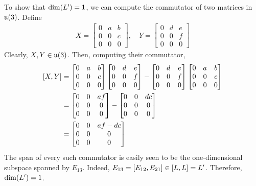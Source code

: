 \begin{boxexample}
    To show that $\dim\!\left( L' \right) = 1$, we can compute the commutator of two matrices in $\mathfrak{u}\!\left( 3 \right)$. Define
    \begin{align*}
        X = \begin{bmatrix}
            0 & a & b \\
            0 & 0 & c \\
            0 & 0 & 0
        \end{bmatrix}, \quad Y = \begin{bmatrix}
            0 & d & e \\
            0 & 0 & f \\
            0 & 0 & 0
        \end{bmatrix}
    \end{align*}
    Clearly, $X, Y \in \mathfrak{u}\!\left( 3 \right)$. Then, computing their commutator,
    \begin{align*}
        \left[ X, Y \right] &= \begin{bmatrix}
            0 & a & b \\
            0 & 0 & c \\
            0 & 0 & 0
        \end{bmatrix} \begin{bmatrix}
            0 & d & e \\
            0 & 0 & f \\
            0 & 0 & 0
        \end{bmatrix} - \begin{bmatrix}
            0 & d & e \\
            0 & 0 & f \\
            0 & 0 & 0
        \end{bmatrix} \begin{bmatrix}
            0 & a & b \\
            0 & 0 & c \\
            0 & 0 & 0
        \end{bmatrix} \\
        &= \begin{bmatrix}
            0 & 0 & af \\
            0 & 0 & 0 \\
            0 & 0 & 0
        \end{bmatrix} - \begin{bmatrix}
            0 & 0 & dc \\
            0 & 0 & 0 \\
            0 & 0 & 0
        \end{bmatrix} \\
        &= \begin{bmatrix}
            0 & 0 & af - dc \\
            0 & 0 & 0 \\
            0 & 0 & 0
        \end{bmatrix}
    \end{align*}
    The span of every such commutator is easily seen to be the one-dimensional subspace spanned by $E_{13}$. Indeed, $E_{13}= \left[ E_{12}, E_{21} \right] \in \left[ L, L \right] = L'$. Therefore, $\dim\!\left( L' \right) = 1$. \\


\end{boxexample}
